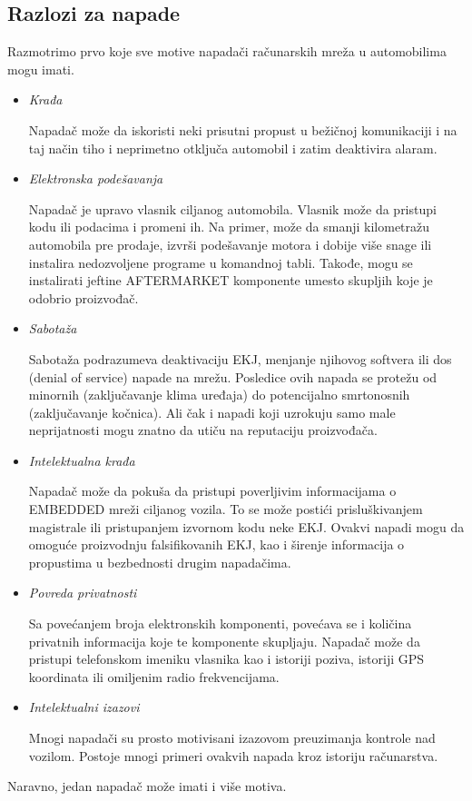 \documentclass[a4paper]{article}
\begin{document}
\subsection{Razlozi za napade}
\label{subsec:napadrazlog}

Razmotrimo prvo koje sve motive napadači računarskih mreža u automobilima mogu imati.

\begin{itemize}
  \item[] \textit{Krađa}
  
  Napadač može da iskoristi neki prisutni propust u bežičnoj komunikaciji i na taj način tiho i neprimetno otključa automobil i zatim deaktivira alaram.
  \item[] \textit{Elektronska podešavanja}
  
  Napadač je upravo vlasnik ciljanog automobila. Vlasnik može da pristupi kodu ili podacima i promeni ih. Na primer, može da smanji kilometražu automobila pre prodaje, izvrši podešavanje motora i dobije više snage ili instalira nedozvoljene programe u komandnoj tabli. Takođe, mogu se instalirati jeftine AFTERMARKET komponente umesto skupljih koje je odobrio proizvođač.
  \item[] \textit{Sabotaža}
  
  Sabotaža podrazumeva deaktivaciju EKJ, menjanje njihovog softvera ili dos (denial of service) napade na mrežu. Posledice ovih napada se protežu od minornih (zaključavanje klima uređaja) do potencijalno smrtonosnih (zaključavanje kočnica). Ali čak i napadi koji uzrokuju samo male neprijatnosti mogu znatno da utiču na reputaciju proizvođača.
  \item[] \textit{Intelektualna krađa}
  
  Napadač može da pokuša da pristupi poverljivim informacijama o EMBEDDED mreži ciljanog vozila. To se može postići prisluškivanjem magistrale ili pristupanjem izvornom kodu neke EKJ. Ovakvi napadi mogu da omoguće proizvodnju falsifikovanih EKJ, kao i širenje informacija o propustima u bezbednosti drugim napadačima. 
  \item[] \textit{Povreda privatnosti}
  
  Sa povećanjem broja elektronskih komponenti, povećava se i količina privatnih informacija koje te komponente skupljaju. Napadač može da pristupi telefonskom imeniku vlasnika kao i istoriji poziva, istoriji GPS koordinata ili omiljenim radio frekvencijama. 
  \item[] \textit{Intelektualni izazovi}
  
  Mnogi napadači su prosto motivisani izazovom preuzimanja kontrole nad vozilom. Postoje mnogi primeri ovakvih napada kroz istoriju računarstva. 
\end{itemize}
Naravno, jedan napadač može imati i više motiva.
\end{document}
